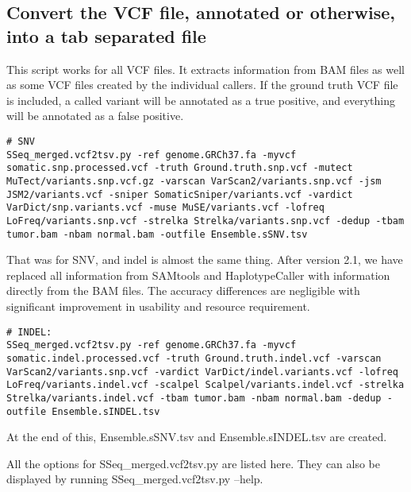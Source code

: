 \documentclass[10pt,letterpaper]{article}
\begin{document}
\begin{sloppypar}
\begin{lstlisting}
\end{lstlisting}



\subsection{Convert the VCF file, annotated or otherwise, into a tab separated file}
This script works for all VCF files. It extracts information from BAM files as well as some VCF files created by the individual callers. If the ground truth VCF file is included, a called variant will be annotated as a true positive, and everything will be annotated as a false positive.

	
\begin{lstlisting}
# SNV
SSeq_merged.vcf2tsv.py -ref genome.GRCh37.fa -myvcf somatic.snp.processed.vcf -truth Ground.truth.snp.vcf -mutect MuTect/variants.snp.vcf.gz -varscan VarScan2/variants.snp.vcf -jsm JSM2/variants.vcf -sniper SomaticSniper/variants.vcf -vardict VarDict/snp.variants.vcf -muse MuSE/variants.vcf -lofreq LoFreq/variants.snp.vcf -strelka Strelka/variants.snp.vcf -dedup -tbam tumor.bam -nbam normal.bam -outfile Ensemble.sSNV.tsv
\end{lstlisting}


That was for SNV, and indel is almost the same thing. After version 2.1, we have replaced all information from SAMtools and HaplotypeCaller with information directly from the BAM files. The accuracy differences are negligible with significant improvement in usability and resource requirement.

\begin{lstlisting}
# INDEL:
SSeq_merged.vcf2tsv.py -ref genome.GRCh37.fa -myvcf somatic.indel.processed.vcf -truth Ground.truth.indel.vcf -varscan VarScan2/variants.snp.vcf -vardict VarDict/indel.variants.vcf -lofreq LoFreq/variants.indel.vcf -scalpel Scalpel/variants.indel.vcf -strelka Strelka/variants.indel.vcf -tbam tumor.bam -nbam normal.bam -dedup -outfile Ensemble.sINDEL.tsv
\end{lstlisting}


At the end of this, Ensemble.sSNV.tsv and Ensemble.sINDEL.tsv are created. 

All the options for SSeq\_merged.vcf2tsv.py are listed here. They can also be displayed by running SSeq\_merged.vcf2tsv.py --help.

\begin{lstlisting}


\end{lstlisting}
\end{sloppypar}
\end{document}

